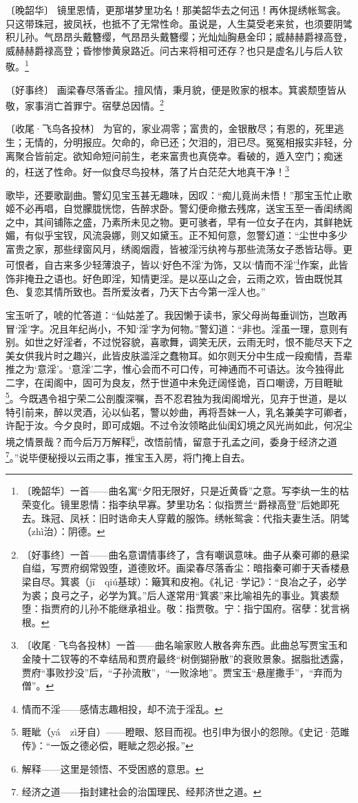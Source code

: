 {    \par 〔晚韶华〕 镜里恩情，更那堪梦里功名！那美韶华去之何迅！再休提绣帐鸳衾。只这带珠冠，披凤袄，也抵不了无常性命。虽说是，人生莫受老来贫，也须要阴骘积儿孙。气昂昂头戴簪缨，气昂昂头戴簪缨；光灿灿胸悬金印；威赫赫爵禄高登，威赫赫爵禄高登；昏惨惨黄泉路近。问古来将相可还存？也只是虚名儿与后人钦敬。\footnote{ 〔晚韶华〕一首——曲名寓“夕阳无限好，只是近黄昏”之意。写李纨一生的枯荣变化。镜里恩情：指李纨早寡。梦里功名：似指贾兰“爵禄高登”后她即死去。珠冠、凤袄：旧时诰命夫人穿戴的服饰。绣帐鸳衾：代指夫妻生活。阴骘（zhì治）：阴德。}
    \par 〔好事终〕 画梁春尽落香尘。擅风情，秉月貌，便是败家的根本。箕裘颓堕皆从敬，家事消亡首罪宁。宿孽总因情。\footnote{〔好事终〕一首——曲名意谓情事终了，含有嘲讽意味。曲子从秦可卿的悬梁自缢，写贾府纲常毁堕，道德败坏。画梁春尽落香尘：暗指秦可卿于天香楼悬梁自尽。箕裘（jī　qiú基球）：簸箕和皮袍。《礼记·学记》：“良冶之子，必学为裘；良弓之子，必学为箕。”后人遂常用“箕裘”来比喻祖先的事业。箕裘颓堕：指贾府的儿孙不能继承祖业。敬：指贾敬。宁：指宁国府。宿孽：犹言祸根。}
    \par 〔收尾·飞鸟各投林〕 为官的，家业凋零；富贵的，金银散尽；有恩的，死里逃生；无情的，分明报应。欠命的，命已还；欠泪的，泪已尽。冤冤相报实非轻，分离聚合皆前定。欲知命短问前生，老来富贵也真侥幸。看破的，遁入空门；痴迷的，枉送了性命。好一似食尽鸟投林，落了片白茫茫大地真干净！\footnote{〔收尾·飞鸟各投林〕一首——曲名喻家败人散各奔东西。此曲总写贾宝玉和金陵十二钗等的不幸结局和贾府最终“树倒猢狲散”的衰败景象。据脂批透露，贾府“事败抄没”后，“子孙流散”，“一败涂地”。贾宝玉“悬崖撒手”，“弃而为僧”。}
}
\par 歌毕，还要歌副曲。警幻见宝玉甚无趣味，因叹：“痴儿竟尚未悟！”那宝玉忙止歌姬不必再唱，自觉朦胧恍惚，告醉求卧。警幻便命撤去残席，送宝玉至一香闺绣阁之中，其间铺陈之盛，乃素所未见之物。更可骇者，早有一位女子在内，其鲜艳妩媚，有似乎宝钗，风流袅娜，则又如黛玉。正不知何意，忽警幻道：“尘世中多少富贵之家，那些绿窗风月，绣阁烟霞，皆被淫污纨袴与那些流荡女子悉皆玷辱。更可恨者，自古来多少轻薄浪子，皆以‘好色不淫’为饰，又以‘情而不淫’\footnote{情而不淫——感情志趣相投，却不流于淫乱。}作案，此皆饰非掩丑之语也。好色即淫，知情更淫。是以巫山之会，云雨之欢，皆由既悦其色、复恋其情所致也。吾所爱汝者，乃天下古今第一淫人也。”
\par 宝玉听了，唬的忙答道：“仙姑差了。我因懒于读书，家父母尚每垂训饬，岂敢再冒‘淫’字。况且年纪尚小，不知‘淫’字为何物。”警幻道：“非也。淫虽一理，意则有别。如世之好淫者，不过悦容貌，喜歌舞，调笑无厌，云雨无时，恨不能尽天下之美女供我片时之趣兴，此皆皮肤滥淫之蠢物耳。如尔则天分中生成一段痴情，吾辈推之为‘意淫’。‘意淫’二字，惟心会而不可口传，可神通而不可语达。汝今独得此二字，在闺阁中，固可为良友，然于世道中未免迂阔怪诡，百口嘲谤，万目睚眦\footnote{睚眦（yá　zì牙自）——瞪眼、怒目而视。也引申为很小的怨隙。《史记·范雎传》：“一饭之德必偿，睚眦之怨必报。”}。今既遇令祖宁荣二公剖腹深嘱，吾不忍君独为我闺阁增光，见弃于世道，是以特引前来，醉以灵酒，沁以仙茗，警以妙曲，再将吾妹一人，乳名兼美字可卿者，许配于汝。今夕良时，即可成姻。不过令汝领略此仙闺幻境之风光尚如此，何况尘境之情景哉？而今后万万解释\footnote{解释——这里是领悟、不受困惑的意思。}，改悟前情，留意于孔孟之间，委身于经济之道\footnote{经济之道——指封建社会的治国理民、经邦济世之道。}。”说毕便秘授以云雨之事，推宝玉入房，将门掩上自去。
